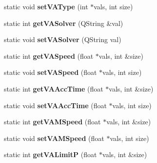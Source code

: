 \begin{DoxyCompactItemize}
\item 
\hypertarget{classRobotConf_a33d3d3fc7169eaa515a0b92218bd51a0}{static void {\bfseries set\-V\-A\-Type} (int $\ast$vals, int size)}\label{classRobotConf_a33d3d3fc7169eaa515a0b92218bd51a0}

\item 
\hypertarget{classRobotConf_ac80617308a9d67dc6720c44807aeea97}{static int {\bfseries get\-V\-A\-Solver} (Q\-String \&val)}\label{classRobotConf_ac80617308a9d67dc6720c44807aeea97}

\item 
\hypertarget{classRobotConf_a404079c98400795d01a72da7354be7fa}{static void {\bfseries set\-V\-A\-Solver} (Q\-String val)}\label{classRobotConf_a404079c98400795d01a72da7354be7fa}

\item 
\hypertarget{classRobotConf_a641c7de44cd0b18521cd803eba26107a}{static int {\bfseries get\-V\-A\-Speed} (float $\ast$vals, int \&size)}\label{classRobotConf_a641c7de44cd0b18521cd803eba26107a}

\item 
\hypertarget{classRobotConf_a0ffce9b8319fa8c4385e96effe1b3a2d}{static void {\bfseries set\-V\-A\-Speed} (float $\ast$vals, int size)}\label{classRobotConf_a0ffce9b8319fa8c4385e96effe1b3a2d}

\item 
\hypertarget{classRobotConf_a40d25a0c4300d4e0b542ee65f69a76fd}{static int {\bfseries get\-V\-A\-Acc\-Time} (float $\ast$vals, int \&size)}\label{classRobotConf_a40d25a0c4300d4e0b542ee65f69a76fd}

\item 
\hypertarget{classRobotConf_a182aeedafa4d50b77f287368113a9fae}{static void {\bfseries set\-V\-A\-Acc\-Time} (float $\ast$vals, int size)}\label{classRobotConf_a182aeedafa4d50b77f287368113a9fae}

\item 
\hypertarget{classRobotConf_acf99e9a8b4f3b990a609f5ced188d5d9}{static int {\bfseries get\-V\-A\-M\-Speed} (float $\ast$vals, int \&size)}\label{classRobotConf_acf99e9a8b4f3b990a609f5ced188d5d9}

\item 
\hypertarget{classRobotConf_a56ad74f9ba7a58bf7a93c6750d88f960}{static void {\bfseries set\-V\-A\-M\-Speed} (float $\ast$vals, int size)}\label{classRobotConf_a56ad74f9ba7a58bf7a93c6750d88f960}

\item 
\hypertarget{classRobotConf_a0bab4d47bcb5e5b65418ebd8e882a140}{static int {\bfseries get\-V\-A\-Limit\-P} (float $\ast$vals, int \&size)}\label{classRobotConf_a0bab4d47bcb5e5b65418ebd8e882a140}


\end{DoxyCompactItemize}
